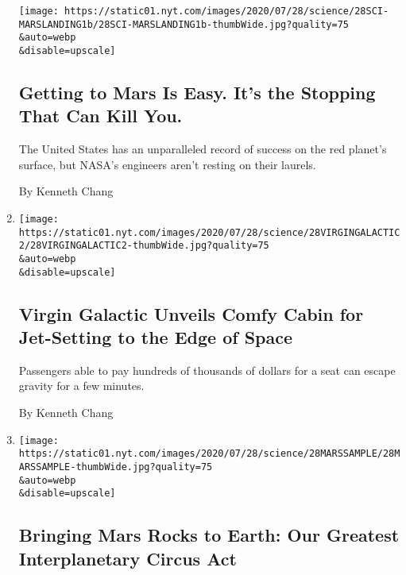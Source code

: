 \begin{enumerate}
  \texttt{[image: https://static01.nyt.com/images/2020/07/28/science/28SCI-MARSLANDING1b/28SCI-MARSLANDING1b-thumbWide.jpg?quality=75\\\&auto=webp\\\&disable=upscale]}

  \hypertarget{getting-to-mars-is-easy-its-the-stopping-that-can-kill-you}{%
  \subsection{Getting to Mars Is Easy. It's the Stopping That Can Kill
  You.}\label{getting-to-mars-is-easy-its-the-stopping-that-can-kill-you}}

  The United States has an unparalleled record of success on the red
  planet's surface, but NASA's engineers aren't resting on their
  laurels.

  By Kenneth Chang
\item
  \href{/2020/07/28/science/virgin-galactic-cabin.html}{}

  \texttt{[image: https://static01.nyt.com/images/2020/07/28/science/28VIRGINGALACTIC2/28VIRGINGALACTIC2-thumbWide.jpg?quality=75\\\&auto=webp\\\&disable=upscale]}

  \hypertarget{virgin-galactic-unveils-comfy-cabin-for-jet-setting-to-the-edge-of-space}{%
  \subsection{Virgin Galactic Unveils Comfy Cabin for Jet-Setting to the
  Edge of
  Space}\label{virgin-galactic-unveils-comfy-cabin-for-jet-setting-to-the-edge-of-space}}

  Passengers able to pay hundreds of thousands of dollars for a seat can
  escape gravity for a few minutes.

  By Kenneth Chang
\item
  \href{/2020/07/28/science/mars-sample-return-mission.html}{}

  \texttt{[image: https://static01.nyt.com/images/2020/07/28/science/28MARSSAMPLE/28MARSSAMPLE-thumbWide.jpg?quality=75\\\&auto=webp\\\&disable=upscale]}

  \hypertarget{bringing-mars-rocks-to-earth-our-greatest-interplanetary-circus-act}{%
  \subsection{Bringing Mars Rocks to Earth: Our Greatest Interplanetary
  Circus
  Act}\label{bringing-mars-rocks-to-earth-our-greatest-interplanetary-circus-act}}


\end{enumerate}
